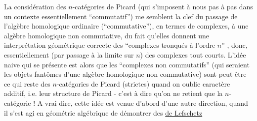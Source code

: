  La considération des $n$-catégories de Picard  (qui s'imposent à nous pas
à pas dans un contexte essentiellement ``commutatif'') me semblent la clef du
passage de l'algèbre homologique ordinaire (``commutative''), en termes de
complexes, à une algèbre homologique non commutative, du fait qu'elles
donnent une interprétation géométrique correcte des ``complexes tronqués à
l'ordre $n$'' , donc, essentiellement (par passage à la limite sur $n$) des
complexes tout courts. L'idée naive qui se présente est alors que les
``complexes non commutatifs'' (qui seraient les objets-fantômes d'une algèbre
homologique non commutative) sont peut-être ce qui reste des $n$-catégories
de Picard (strictes) quand on oublie  caractère additif, i.e. leur
structure de Picard - c'est à dire qu'on ne retient que la $n$-catégorie !
A vrai dire, cette idée est venue d'abord d'une autre direction, quand il
s'est agi en géométrie algébrique de démontrer des \uline{ de Lefschetz}

